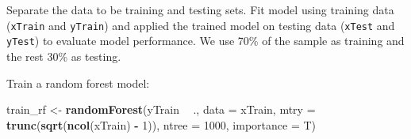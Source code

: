 \documentclass[12pt,]{krantz}
\makeatletter
\newenvironment{Shaded}{\begin{snugshade}}{\end{snugshade}}
\newcommand{\CommentTok}[1]{\textcolor[rgb]{0.37,0.37,0.37}{\textit{#1}}}
\newcommand{\DataTypeTok}[1]{\textcolor[rgb]{0.27,0.27,0.27}{#1}}
\newcommand{\DecValTok}[1]{\textcolor[rgb]{0.06,0.06,0.06}{#1}}
\newcommand{\FloatTok}[1]{\textcolor[rgb]{0.06,0.06,0.06}{#1}}
\newcommand{\KeywordTok}[1]{\textcolor[rgb]{0.27,0.27,0.27}{\textbf{#1}}}
\newcommand{\NormalTok}[1]{#1}
\newcommand{\OperatorTok}[1]{\textcolor[rgb]{0.43,0.43,0.43}{\textbf{#1}}}
\newcommand{\StringTok}[1]{\textcolor[rgb]{0.5,0.5,0.5}{#1}}
\newenvironment{kframe}{%
\medskip{}
\setlength{\fboxsep}{.8em}
 \def\at@end@of@kframe{}%
 \ifinner\ifhmode%
  \def\at@end@of@kframe{\end{minipage}}%
  \begin{minipage}{\columnwidth}%
 \fi\fi%
 \def\FrameCommand##1{\hskip\@totalleftmargin \hskip-\fboxsep
 \colorbox{shadecolor}{##1}\hskip-\fboxsep
     \hskip-\linewidth \hskip-\@totalleftmargin \hskip\columnwidth}%
 \MakeFramed {\advance\hsize-\width
   \@totalleftmargin\z@ \linewidth\hsize
   \@setminipage}}%
 {\par\unskip\endMakeFramed%
 \at@end@of@kframe}
\renewenvironment{Shaded}{\begin{kframe}}{\end{kframe}}
\makeatother
\begin{document}
Separate the data to be training and testing sets. Fit model using training data (\texttt{xTrain} and \texttt{yTrain}) and applied the trained model on testing data (\texttt{xTest} and \texttt{yTest}) to evaluate model performance. We use 70\% of the sample as training and the rest 30\% as testing.

\begin{Shaded}
\end{Shaded}

Train a random forest model:

\begin{Shaded}
\begin{Highlighting}[]
\NormalTok{train_rf <-}\StringTok{ }\KeywordTok{randomForest}\NormalTok{(yTrain }\OperatorTok{~}\StringTok{ }\NormalTok{., }\DataTypeTok{data =}\NormalTok{ xTrain, }\DataTypeTok{mtry =} \KeywordTok{trunc}\NormalTok{(}\KeywordTok{sqrt}\NormalTok{(}\KeywordTok{ncol}\NormalTok{(xTrain) }\OperatorTok{-}\StringTok{ }
\StringTok{    }\DecValTok{1}\NormalTok{)), }\DataTypeTok{ntree =} \DecValTok{1000}\NormalTok{, }\DataTypeTok{importance =}\NormalTok{ T)}
\end{Highlighting}
\end{Shaded}
\end{document}

